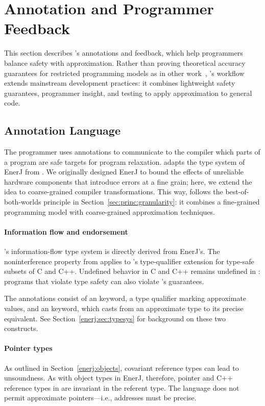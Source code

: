 \section{Annotation and Programmer Feedback}
\label{accept:sec:annotation-feedback}

This section describes \sysname's annotations and feedback,
which help programmers balance safety with approximation.
Rather than proving theoretical accuracy guarantees for restricted programming
models as in other work~\cite{sasa-sas11, zhu-popl12, passert},
\sysname's workflow extends mainstream development practices: it combines
lightweight safety guarantees, programmer insight, and testing to apply
approximation to general code.

\subsection{Annotation Language}
\label{accept:sec:language}

The programmer uses annotations to communicate to the compiler which parts of
a program are safe targets for program relaxation.
\sysname adapts the type system of EnerJ from .
We originally designed EnerJ to bound the effects of unreliable hardware
components that introduce errors at a fine grain;
here, we extend the idea to coarse-grained compiler transformations.
This way, \sysname follows the best-of-both-worlds principle in
Section~\ref{sec:princ:granularity}: it combines a fine-grained programming model with
coarse-grained approximation techniques.

\paragraph{Information flow and endorsement}
\sysname's information-flow type system is directly derived from EnerJ's.
The noninterference property from  applies
to \sysname's
type-qualifier extension for type-safe subsets of C and C++.
Undefined behavior in C and C++ remains undefined in \sysname:
programs that violate type safety can also violate \sysname's guarantees.

The annotations consist of an  keyword, a type qualifier marking
approximate values, and an  keyword, which casts from an
approximate type to its precise equivalent. See
Section~\ref{enerj:sec:typesys} for background on these two constructs.

\paragraph{Pointer types}
As outlined in Section~\ref{enerj:objects}, covariant reference types can
lead to unsoundness.
As with object types in EnerJ, therefore, pointer and C++ reference types in \sysname are invariant in the referent type.
The language does not permit approximate pointers---i.e., addresses must be
precise.


